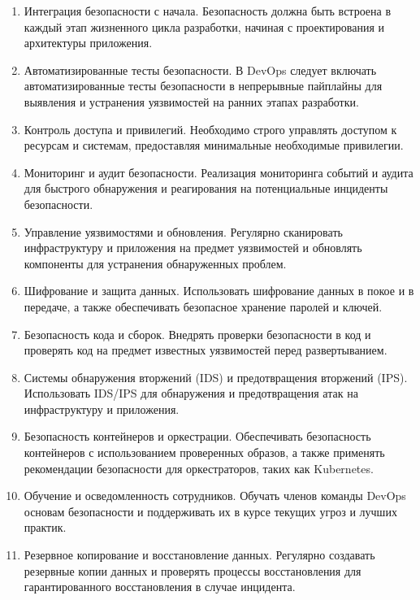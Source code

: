 \documentclass[referat]{SCWorks}
\begin{document}
\begin{enumerate}
  \item Интеграция безопасности с начала. Безопасность должна быть встроена в каждый этап жизненного цикла разработки, начиная с проектирования и архитектуры приложения.

  \item Автоматизированные тесты безопасности. В DevOps следует включать автоматизированные тесты безопасности в непрерывные пайплайны для выявления и устранения уязвимостей на ранних этапах разработки.

  \item Контроль доступа и привилегий. Необходимо строго управлять доступом к ресурсам и системам, предоставляя минимальные необходимые привилегии.

  \item Мониторинг и аудит безопасности. Реализация мониторинга событий и аудита для быстрого обнаружения и реагирования на потенциальные инциденты безопасности.

  \item Управление уязвимостями и обновления. Регулярно сканировать инфраструктуру и приложения на предмет уязвимостей и обновлять компоненты для устранения обнаруженных проблем.

  \item Шифрование и защита данных. Использовать шифрование данных в покое и в передаче, а также обеспечивать безопасное хранение паролей и ключей.

  \item Безопасность кода и сборок. Внедрять проверки безопасности в код и проверять код на предмет известных уязвимостей перед развертыванием.

  \item Системы обнаружения вторжений (IDS) и предотвращения вторжений (IPS). Использовать IDS/IPS для обнаружения и предотвращения атак на инфраструктуру и приложения.

  \item Безопасность контейнеров и оркестрации. Обеспечивать безопасность контейнеров с использованием проверенных образов, а также применять рекомендации безопасности для оркестраторов, таких как Kubernetes.

  \item Обучение и осведомленность сотрудников. Обучать членов команды DevOps основам безопасности и поддерживать их в курсе текущих угроз и лучших практик.

  \item Резервное копирование и восстановление данных. Регулярно создавать резервные копии данных и проверять процессы восстановления для гарантированного восстановления в случае инцидента.
\end{enumerate}
\end{document}
